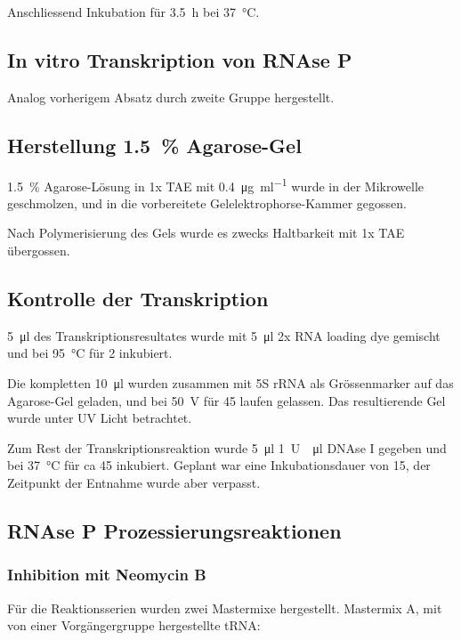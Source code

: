 \documentclass[a4paper,english]{scrreprt}
\begin{document}
Anschliessend Inkubation für \SI{3.5}{\hour} bei \SI{37}{\celsius}.

\subsection{In vitro Transkription von RNAse P}

Analog vorherigem Absatz durch zweite Gruppe hergestellt.

\subsection{Herstellung \SI{1.5}{\percent} Agarose-Gel}

\SI{1.5}{\percent} Agarose-Lösung in 1x TAE mit \SI{0.4}{\ug \per \ml}
 wurde in der Mikrowelle geschmolzen, und in die vorbereitete
Gelelektrophorse-Kammer gegossen.

Nach Polymerisierung des Gels wurde es zwecks Haltbarkeit mit 1x TAE
übergossen.

\subsection{Kontrolle der Transkription}

\SI{5}{\ul} des Transkriptionsresultates wurde mit \SI{5}{\ul} 2x RNA loading
dye gemischt und bei \SI{95}{\celsius} für \SI{2}{\min} inkubiert.

Die kompletten \SI{10}{\ul} wurden zusammen mit 5S rRNA als Grössenmarker auf
das Agarose-Gel geladen, und bei \SI{50}{\volt} für \SI{45}{\min} laufen
gelassen. Das resultierende Gel wurde unter UV Licht betrachtet.

Zum Rest der Transkriptionsreaktion wurde \SI{5}{\ul} \SI{1}{U \per \ul} DNAse
I gegeben und bei \SI{37}{\celsius} für ca \SI{45}{\min} inkubiert. Geplant war
eine Inkubationsdauer von \SI{15}{\min}, der Zeitpunkt der Entnahme wurde aber
verpasst.

\subsection{RNAse P Prozessierungsreaktionen}

\subsubsection{Inhibition mit Neomycin B}

Für die Reaktionsserien wurden zwei Mastermixe hergestellt. Mastermix A, mit
von einer Vorgängergruppe hergestellte tRNA:
\\
\end{document}
